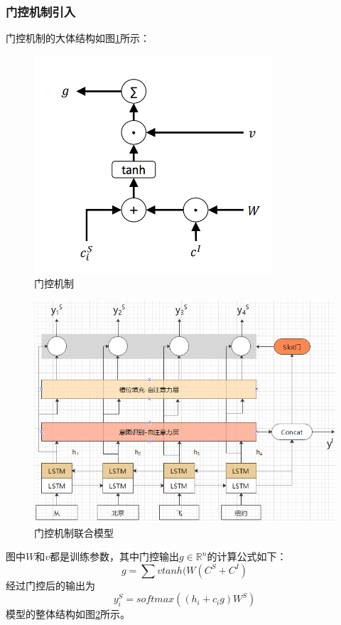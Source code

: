 \documentclass[twoside,a4paper,12pt]{book}%
\begin{document}
\subsubsection{门控机制引入}
门控机制的大体结构如图\ref{fig:sg_sl1}所示：
\begin{figure}[htbp]
\begin{center}
\includegraphics[width=3.5in]{figures/sg-sl1.png}
\caption{门控机制}\label{fig:sg_sl1}

\end{center}
\end{figure}
\begin{figure}[htbp]
	\begin{center}
		\includegraphics[width=5.2in]{figures/sg-sl3.png}
		\caption{门控机制联合模型}
		\label{fig:sg-sl3}
	\end{center}
\end{figure}
图中$W$和$v$都是训练参数，其中门控输出$g \in \mathbb{R}^n$的计算公式如下：
$$
g =\sum{v tanh(W(C^S+C^I)}
$$
经过门控后的输出为
$$
y^S_i=softmax((h_i+c_ig)W^S)
$$
模型的整体结构如图\ref{fig:sg-sl3}所示。
\end{document}
